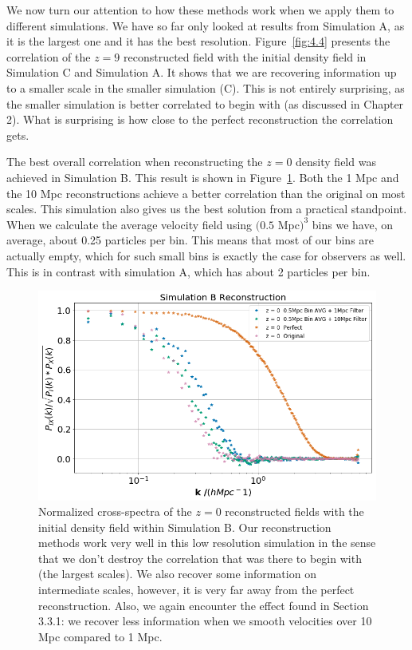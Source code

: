 We now turn our attention to how these methods work when we apply them to different simulations. We have so far only looked at results from Simulation A, as it is the largest one and it has the best resolution. Figure~\ref{fig:4.4} presents the correlation of the $z=9$ reconstructed field with the initial density field in Simulation C and Simulation A. It shows that we are recovering information up to a smaller scale in the smaller simulation (C). This is not entirely surprising, as the smaller simulation is better correlated to begin with (as discussed in Chapter 2). What is surprising is how close to the perfect reconstruction the correlation gets.

The best overall correlation when reconstructing the $z=0$ density field was achieved in Simulation B. This result is shown in Figure~\ref{fig:4.5}. Both the 1 Mpc and the 10 Mpc reconstructions achieve a better correlation than the original on most scales. This simulation also gives us the best solution from a practical standpoint. When we calculate the average velocity field using $(0.5$ Mpc$)^3$ bins we have, on average, about 0.25 particles per bin. This means that most of our bins are actually empty, which for such small bins is exactly the case for observers as well. This is in contrast with simulation A, which has about 2 particles per bin.

\begin{figure}
    \centering
    \includegraphics[width=1\columnwidth]{images/realRecon/simBRecon.png}%
    
    \caption{
        Normalized cross-spectra of the $z=0$ reconstructed fields with the initial density field within Simulation B. Our reconstruction methods work very well in this low resolution simulation in the sense that we don't destroy the correlation that was there to begin with (the largest scales). We also recover some information on intermediate scales, however, it is very far away from the perfect reconstruction. Also, we again encounter the effect found in Section 3.3.1: we recover less information when we smooth velocities over 10 Mpc compared to 1 Mpc. 
    }
    
    \label{fig:4.5}
\end{figure}

